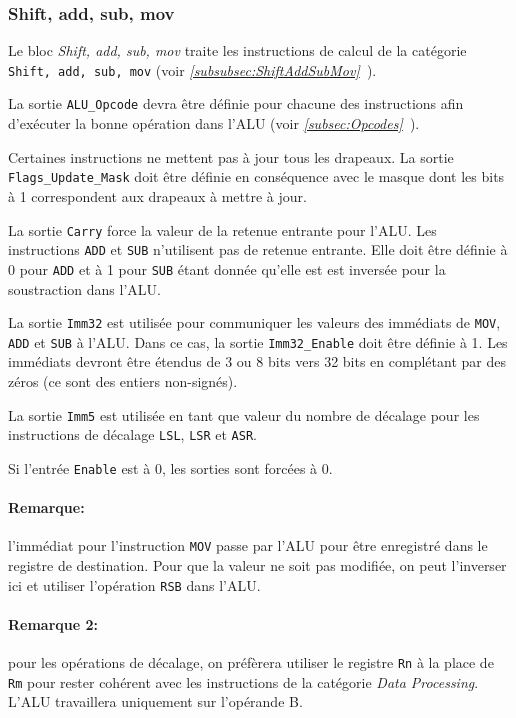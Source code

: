 \subsubsection{Shift, add, sub, mov}


Le bloc \textit{Shift, add, sub, mov} traite les instructions de calcul de la catégorie \texttt{Shift, add, sub, mov} (voir \textit{\ref{subsubsec:ShiftAddSubMov}~}).

La sortie \texttt{ALU\_Opcode} devra être définie pour chacune des instructions afin d'exécuter la bonne opération dans l'ALU (voir \textit{\ref{subsec:Opcodes}~}).

Certaines instructions ne mettent pas à jour tous les drapeaux. La sortie \texttt{Flags\_Update\_Mask} doit être définie en conséquence avec le masque dont les bits à 1 correspondent aux drapeaux à mettre à jour.

La sortie \texttt{Carry} force la valeur de la retenue entrante pour l'ALU. Les instructions \texttt{ADD} et \texttt{SUB} n'utilisent pas de retenue entrante.
Elle doit être définie à 0 pour \texttt{ADD} et à 1 pour \texttt{SUB} étant donnée qu'elle est est inversée pour la soustraction dans l'ALU.

La sortie \texttt{Imm32} est utilisée pour communiquer les valeurs des immédiats de \texttt{MOV}, \texttt{ADD} et \texttt{SUB} à l'ALU. Dans ce cas, la sortie \texttt{Imm32\_Enable} doit être définie à 1.
Les immédiats devront être étendus de 3 ou 8 bits vers 32 bits en complétant par des zéros (ce sont des entiers non-signés).

La sortie \texttt{Imm5} est utilisée en tant que valeur du nombre de décalage pour les instructions de décalage \texttt{LSL}, \texttt{LSR} et \texttt{ASR}.

Si l'entrée \texttt{Enable} est à 0, les sorties sont forcées à 0.

\paragraph{Remarque:} l'immédiat pour l'instruction \texttt{MOV} passe par l'ALU pour être enregistré dans le registre de destination.
Pour que la valeur ne soit pas modifiée, on peut l'inverser ici et utiliser l'opération \texttt{RSB} dans l'ALU.

\paragraph{Remarque 2:} pour les opérations de décalage, on préfèrera utiliser le registre \texttt{Rn} à la place de \texttt{Rm} pour rester cohérent avec les instructions de la catégorie \textit{Data Processing}. L'ALU travaillera uniquement sur l'opérande B.

